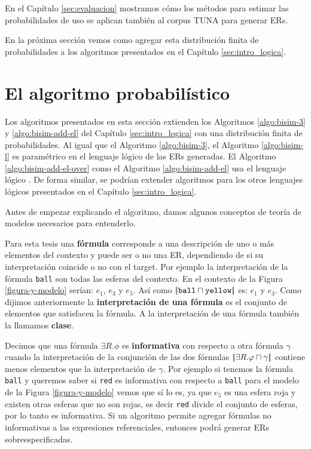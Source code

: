 En el Cap\'itulo \ref{sec:evaluacion} mostramos c\'omo los m\'etodos para estimar las probabilidades de uso se aplican tambi\'en al corpus TUNA para generar ERs.

En la pr\'oxima secci\'on vemos como agregar esta distribuci\'on finita de probabilidades a los algoritmos presentados en el Cap\'itulo \ref{sec:intro_logica}. 

\newpage

\section{El algoritmo probabil\'istico}
\label{sec:algoritmo_probabilistico}

Los algoritmos presentados en esta secci\'on extienden los Algoritmos \ref{algo:bisim-3} y \ref{algo:bisim-add-el} del Cap\'itulo \ref{sec:intro_logica} con una distribuci\'on finita de probabilidades. Al igual que el Algoritmo \ref{algo:bisim-3}, el Algoritmo \ref{algo:bisim-l} es param\'etrico en el lenguaje l\'ogico de las ERs generadas. El Algoritmo \ref{algo:bisim-add-el-over} como el Algoritmo \ref{algo:bisim-add-el} usa el lenguaje l\'ogico \EL. De forma similar, se podr\'ian extender algoritmos para los otros lenguajes l\'ogicos presentados en el Cap\'itulo \ref{sec:intro_logica}.  

Antes de empezar explicando el algoritmo, damos algunos conceptos de teor\'ia de modelos necesarios para entenderlo.

Para esta tesis una \textbf{f\'ormula} corresponde a una descripci\'on de uno o m\'as elementos del contexto y puede ser o no una ER, dependiendo de 
si su interpretaci\'on coincide o no con el target. Por ejemplo la interpretaci\'on de la f\'ormula \texttt{ball} son todas las esferas 
del contexto. En el contexto de la Figura \ref{figura-y-modelo} ser\'ian: $e_1$, $e_3$ y $e_5$. As\'i como $|\!|\texttt{ball} \sqcap \texttt{yellow}|\!|$ es: $e_1$ y $e_3$.
Como dijimos anteriormente la \textbf{interpretaci\'on de una f\'ormula} es el conjunto de elementos que satisfacen la f\'ormula. A la interpretaci\'on de una f\'ormula tambi\'en la llamamos \textbf{clase}.

Decimos que una f\'ormula $\exists R. \phi$ es \textbf{informativa} con respecto a otra f\'ormula $\gamma$ cuando la interpretaci\'on de la conjunci\'on de las dos f\'ormulas $|\!|\exists R. \varphi \sqcap \gamma|\!|$ contiene menos elementos que la interpretaci\'on de $\gamma$. Por ejemplo si tenemos la f\'ormula \texttt{ball} y 
queremos saber si \texttt{red} es informativa con respecto a \texttt{ball} para el modelo de la Figura \ref{figura-y-modelo} vemos que s\'i lo es, ya que $e_5$ es una esfera roja y existen otras esferas que no son rojas,
 es decir \texttt{red} divide el conjunto de esferas, por lo tanto es informativa. Si un algoritmo permite agregar f\'ormulas no informativas a las expresiones referenciales, entonces podr\'a generar ERs sobreespecificadas.
 
